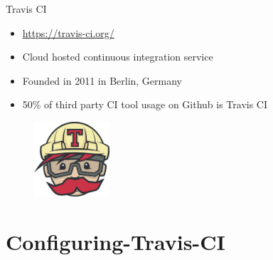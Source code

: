\documentclass[aspectratio=169,xcolor=dvipsnames]{beamer}
\begin{document}
\begin{frame}{Travis CI}

\begin{itemize}
    \item \url{https://travis-ci.org/}
    \item Cloud hosted continuous integration service
    \item Founded in 2011 in Berlin, Germany
    \item 50\% of third party CI tool usage on Github is Travis CI  \cite{noauthor_github_2017}
    
\end{itemize}
         \begin{figure}
            \centering
            \includegraphics[width=0.25\textwidth]{images/TravisCI-Mascot-1.png}
            \label{fig:my_label}
        \end{figure}
\end{frame}

\section{Configuring-Travis-CI}
\end{document}
